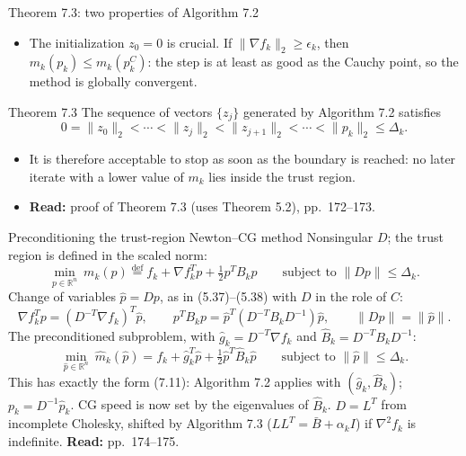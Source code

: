 \documentclass[aspectratio=169,12pt]{beamer}
\newcommand{\R}{\mathbb{R}}
\newcommand{\gradf}{\nabla f}
\newcommand{\hessf}{\nabla^{2} f}
\newcommand{\readbook}[1]{{\color{red}\textbf{Read:} #1}}
\begin{document}
\begin{frame}{Theorem 7.3: two properties of Algorithm 7.2}
  \begin{itemize}\setlength\itemsep{0.3em}
    \item The initialization $z_{0}=0$ is crucial. If $\|\gradf_{k}\|_{2}\ge\epsilon_{k}$, then
      $m_{k}(p_{k})\le m_{k}(p_{k}^{C})$: the step is at least as good as the Cauchy point, so the
      method is globally convergent.
  \end{itemize}

  \begin{block}{Theorem 7.3}
    The sequence of vectors $\{z_{j}\}$ generated by Algorithm 7.2 satisfies
    \[ 0=\|z_{0}\|_{2}<\cdots<\|z_{j}\|_{2}<\|z_{j+1}\|_{2}<\cdots<\|p_{k}\|_{2}\le\Delta_{k} . \]
  \end{block}

  \begin{itemize}\setlength\itemsep{0.3em}
    \item It is therefore acceptable to stop as soon as the boundary is reached: no later
      iterate with a lower value of $m_{k}$ lies inside the trust region.
    \item \readbook{proof of Theorem 7.3 (uses Theorem 5.2), pp.~172--173.}
  \end{itemize}
\end{frame}

\begin{frame}{Preconditioning the trust-region Newton--CG method}
  \setlength{\abovedisplayskip}{5pt}\setlength{\belowdisplayskip}{5pt}%
  Nonsingular $D$; the trust region is defined in the scaled norm:
  \[
    \min_{p\in\R^{n}}\ m_{k}(p)\overset{\text{def}}{=}f_{k}+\gradf_{k}^{T}p+\tfrac12p^{T}B_{k}p
    \qquad\text{subject to }\|Dp\|\le\Delta_{k} .
    \tag{7.13}
  \]
  Change of variables $\hat p=Dp$, as in (5.37)--(5.38) with $D$ in the role of $C$:
  \[
    \gradf_{k}^{T}p=(D^{-T}\gradf_{k})^{T}\hat p,\qquad
    p^{T}B_{k}p=\hat p^{T}(D^{-T}B_{k}D^{-1})\hat p,\qquad
    \|Dp\|=\|\hat p\| .
  \]
  The preconditioned subproblem, with $\hat g_{k}=D^{-T}\gradf_{k}$ and $\hat B_{k}=D^{-T}B_{k}D^{-1}$:
  \[
    \min_{\hat p\in\R^{n}}\ \hat m_{k}(\hat p)=f_{k}+\hat g_{k}^{T}\hat p+\tfrac12\hat p^{T}\hat B_{k}\hat p
    \qquad\text{subject to }\|\hat p\|\le\Delta_{k} .
  \]
  This has exactly the form (7.11): Algorithm 7.2 applies with $(\hat g_{k},\hat B_{k})$; $p_{k}=D^{-1}\hat p_{k}$.
  CG speed is now set by the eigenvalues of $\hat B_{k}$. $D=L^{T}$ from incomplete Cholesky,
  shifted by Algorithm 7.3 ($LL^{T}=\bar B+\alpha_{k}I$) if $\hessf_{k}$ is indefinite. \readbook{pp.~174--175.}
\end{frame}
\end{document}
